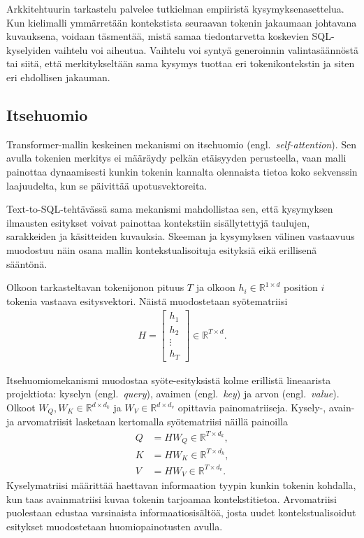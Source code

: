 Arkkitehtuurin tarkastelu palvelee tutkielman empiiristä kysymyksenasettelua.
Kun kielimalli ymmärretään kontekstista seuraavan tokenin jakaumaan
johtavana kuvauksena, voidaan täsmentää, mistä samaa tiedontarvetta
koskevien SQL-kyselyiden vaihtelu voi aiheutua. Vaihtelu voi syntyä
generoinnin valintasäännöstä tai siitä, että merkitykseltään sama
kysymys tuottaa eri tokenikontekstin ja siten eri ehdollisen jakauman.

\subsection{Itsehuomio}

Transformer-mallin keskeinen mekanismi on itsehuomio (engl.\ \emph{self-attention}). Sen avulla tokenien merkitys ei määräydy pelkän etäisyyden perusteella, vaan malli painottaa dynaamisesti kunkin tokenin kannalta olennaista tietoa koko sekvenssin laajuudelta, kun se päivittää upotusvektoreita.

Text-to-SQL-tehtävässä sama mekanismi mahdollistaa sen, että
kysymyksen ilmausten esitykset voivat painottaa kontekstiin
sisällytettyjä taulujen, sarakkeiden ja käsitteiden kuvauksia.
Skeeman ja kysymyksen välinen vastaavuus muodostuu näin osana
mallin kontekstualisoituja esityksiä eikä erillisenä sääntönä.

Olkoon tarkasteltavan tokenijonon pituus \(T\) ja olkoon \(h_i \in \mathbb{R}^{1 \times d}\) position \(i\) tokenia vastaava esitysvektori. Näistä muodostetaan syötematriisi
\begin{align*}
  H
  =
  \begin{bmatrix}
    h_1 \\
    h_2 \\
    \vdots \\
    h_T
  \end{bmatrix}
  \in \mathbb{R}^{T \times d}.
\end{align*}

Itsehuomiomekanismi muodostaa syöte-esityksistä kolme erillistä lineaarista projektiota: kyselyn (engl.\ \emph{query}), avaimen (engl.\ \emph{key}) ja arvon (engl.\ \emph{value}). Olkoot \(W_Q, W_K \in \mathbb{R}^{d \times d_k}\) ja \(W_V \in \mathbb{R}^{d \times d_v}\) opittavia painomatriiseja. Kysely-, avain- ja arvomatriisit lasketaan kertomalla syötematriisi näillä painoilla
\begin{align*}
  Q &= H W_Q \in \mathbb{R}^{T \times d_k}, \\
  K &= H W_K \in \mathbb{R}^{T \times d_k}, \\
  V &= H W_V \in \mathbb{R}^{T \times d_v}.
\end{align*}
Kyselymatriisi määrittää haettavan informaation tyypin kunkin tokenin kohdalla, kun taas avainmatriisi kuvaa tokenin tarjoamaa kontekstitietoa. Arvomatriisi puolestaan edustaa varsinaista informaatiosisältöä, josta uudet kontekstualisoidut esitykset muodostetaan huomiopainotusten avulla.

